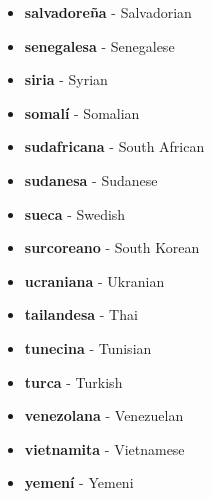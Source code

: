 \documentclass[12pt]{article}
\begin{document}
\begin{itemize}
            \item \textbf{salvadoreña} - Salvadorian
            \item \textbf{senegalesa} - Senegalese
            \item \textbf{siria} - Syrian
            \item \textbf{somalí} - Somalian
            \item \textbf{sudafricana} - South African
            \item \textbf{sudanesa} - Sudanese
            \item \textbf{sueca} - Swedish
            \item \textbf{surcoreano} - South Korean
            \item \textbf{ucraniana} - Ukranian
            \item \textbf{tailandesa} - Thai
            \item \textbf{tunecina} - Tunisian
            \item \textbf{turca} - Turkish
            \item \textbf{venezolana} - Venezuelan
            \item \textbf{vietnamita} - Vietnamese
            \item \textbf{yemení} - Yemeni
        \end{itemize}
\end{document}
